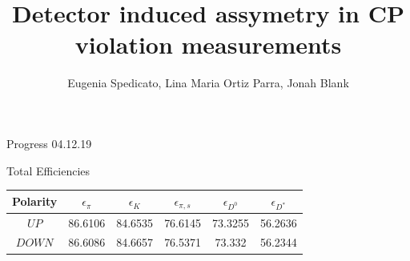 \documentclass[11pt]{beamer}
\author{Eugenia Spedicato, Lina Maria Ortiz Parra, Jonah Blank}
\title{Detector induced assymetry in CP violation measurements}
\begin{document}
\begin{frame}
\titlepage
\end{frame}


\begin{frame}
\begin{LARGE}
Progress 04.12.19
\end{LARGE}
\end{frame}
\begin{frame}{Total Efficiencies}
\begin{table}
	\begin{tabular}{cS[table-format=2.4]S[table-format=2.4]S[table-format=2.4]S[table-format=2.4]S[table-format=2.4]}
		\toprule
		{Polarity} & {$\epsilon_{\pi} $} & {$\epsilon_{K} $} & {$ \epsilon_{\pi,s} $} & {$\epsilon_{D^0} $} & {$\epsilon_{D^*} $} \\
		\midrule
		$UP$ & 86.6106 & 84.6535 & 76.6145 & 73.3255 & 56.2636 \\
		$DOWN$ & 86.6086 & 84.6657 & 76.5371 & 73.332 & 56.2344 \\
		\bottomrule
	\end{tabular}
\end{table}
\end{frame}
\end{document}
